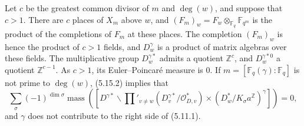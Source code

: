 \documentclass[10pt]{article}
\newcommand{\Fq}{\mathbb F_q}
\newcommand{\Fqm}{\mathbb F_{q^m}}
\newcommand{\Z}{\mathbb Z}
\newcommand{\degm}{\operatorname{deg}}
\newcommand{\mass}{\operatorname{mass}}
\theoremstyle{deligne}
\newcommand{\heading}[1]{\vspace{0.7em}\noindent{\bfseries #1}\quad}
\begin{document}
\heading{5.16.} Let $c$ be the greatest common divisor of $m$ and $\degm(w)$, and suppose that $c>1$. There are $c$ places of $X_m$ above $w$, and $(F_m)_w=F_w\otimes_{\Fq}\Fqm$ is the product of the completions of $F_m$ at these places. The completion $(F_m)_w$ is hence the product of $c>1$ fields, and $D_w^\gamma$ is a product of matrix algebras over these fields. The multiplicative group $D_w^{\gamma *}$ admits a quotient $\Z^c$, and $D_w^{\gamma *0}$ a quotient $\Z^{c-1}$. As $c>1$, its Euler--Poincar\'e measure is $0$. If $m=[\Fq(\gamma):\Fq]$ is not prime to $\degm(w)$, (5.15.2) implies that
\[
\sum_\sigma(-1)^{\dim\sigma}\mass\left([D^{\gamma *}\backslash
\prod'_{v\ne w}(D_v^{\gamma *}/\mathcal O_{D,v}^*)\times(D_w^*/K_\sigma a^\Z)^\gamma]\right)=0,
\]
and $\gamma$ does not contribute to the right side of (5.11.1).
\end{document}
